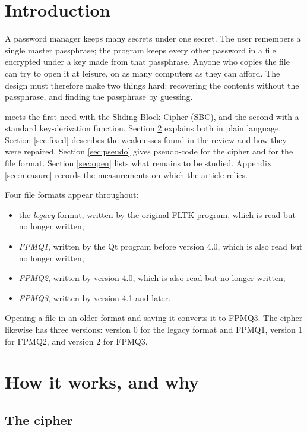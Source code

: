 \clearpage
\tableofcontents


\clearpage
\section{Introduction}

A password manager keeps many secrets under one secret. The user remembers a
single master passphrase; the program keeps every other password in a file
encrypted under a key made from that passphrase. Anyone who copies the file can
try to open it at leisure, on as many computers as they can afford. The design
must therefore make two things hard: recovering the contents without the
passphrase, and finding the passphrase by guessing.

 meets the first need with the Sliding Block Cipher (SBC), and the
second with a standard key-derivation function. Section \ref{sec:how} explains
both in plain language. Section \ref{sec:fixed} describes the weaknesses found
in the review and how they were repaired. Section \ref{sec:pseudo} gives
pseudo-code for the cipher and for the file format. Section \ref{sec:open}
lists what remains to be studied. Appendix \ref{sec:measure} records the
measurements on which the article relies.

Four file formats appear throughout:
\begin{itemize}[nosep]
\item the \emph{legacy} format, written by the original FLTK program, which is
      read but no longer written;
\item \emph{FPMQ1}, written by the Qt program before version 4.0, which is also
      read but no longer written;
\item \emph{FPMQ2}, written by version 4.0, which is also read but no longer
      written;
\item \emph{FPMQ3}, written by version 4.1 and later.
\end{itemize}
Opening a file in an older format and saving it converts it to FPMQ3. The
cipher likewise has three versions: version 0 for the legacy format and FPMQ1,
version 1 for FPMQ2, and version 2 for FPMQ3.

\section{How it works, and why}
\label{sec:how}

\subsection{The cipher}

